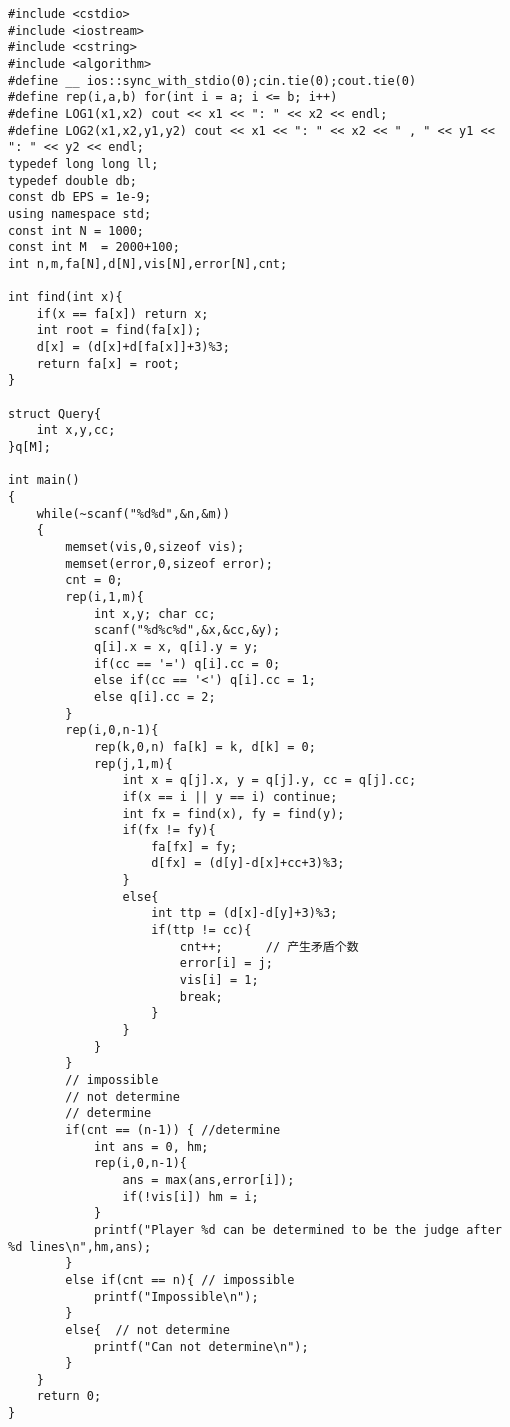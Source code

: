 \documentclass[twoside]{article}
\begin{document}
\begin{lstlisting}
#include <cstdio>
#include <iostream>
#include <cstring>
#include <algorithm>
#define __ ios::sync_with_stdio(0);cin.tie(0);cout.tie(0)
#define rep(i,a,b) for(int i = a; i <= b; i++)
#define LOG1(x1,x2) cout << x1 << ": " << x2 << endl;
#define LOG2(x1,x2,y1,y2) cout << x1 << ": " << x2 << " , " << y1 << ": " << y2 << endl;
typedef long long ll;
typedef double db;
const db EPS = 1e-9;
using namespace std;
const int N = 1000;
const int M  = 2000+100;
int n,m,fa[N],d[N],vis[N],error[N],cnt;

int find(int x){
	if(x == fa[x]) return x;
	int root = find(fa[x]);
	d[x] = (d[x]+d[fa[x]]+3)%3;
	return fa[x] = root;
}

struct Query{
	int x,y,cc;
}q[M];

int main()
{
	while(~scanf("%d%d",&n,&m))
	{
		memset(vis,0,sizeof vis);
		memset(error,0,sizeof error);
		cnt = 0;
		rep(i,1,m){
			int x,y; char cc;
			scanf("%d%c%d",&x,&cc,&y);
			q[i].x = x, q[i].y = y;
			if(cc == '=') q[i].cc = 0;
			else if(cc == '<') q[i].cc = 1;
			else q[i].cc = 2;
		}
		rep(i,0,n-1){
			rep(k,0,n) fa[k] = k, d[k] = 0;
			rep(j,1,m){
				int x = q[j].x, y = q[j].y, cc = q[j].cc;
				if(x == i || y == i) continue;
				int fx = find(x), fy = find(y);
				if(fx != fy){
					fa[fx] = fy;
					d[fx] = (d[y]-d[x]+cc+3)%3;
				}
				else{
					int ttp = (d[x]-d[y]+3)%3;
					if(ttp != cc){
						cnt++;		// 产生矛盾个数
						error[i] = j;
						vis[i] = 1;
						break;
					} 
				}
			}
		}
		// impossible
		// not determine
		// determine
		if(cnt == (n-1)) { //determine
			int ans = 0, hm;
			rep(i,0,n-1){
				ans = max(ans,error[i]);
				if(!vis[i]) hm = i;
			} 
			printf("Player %d can be determined to be the judge after %d lines\n",hm,ans);
		}
		else if(cnt == n){ // impossible
			printf("Impossible\n");
		}	
		else{  // not determine
			printf("Can not determine\n");
		}
	}
	return 0;
}
\end{lstlisting}
\end{document}
